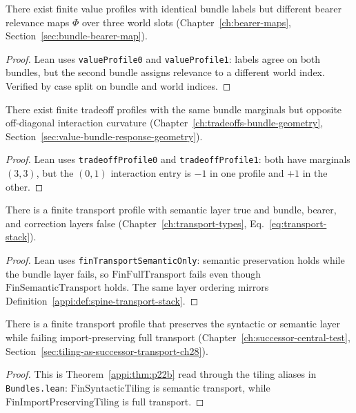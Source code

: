 \begin{theorem}
\label{appi:thm:p17}
There exist finite value profiles with identical bundle labels but different bearer relevance maps \(\Phi\) over three world slots (Chapter~\ref{ch:bearer-maps}, Section~\ref{sec:bundle-bearer-map}).
\end{theorem}
\begin{proof}
Lean uses \texttt{valueProfile0} and \texttt{valueProfile1}: labels agree on both bundles, but the second bundle assigns relevance to a different world index. Verified by case split on bundle and world indices.
\end{proof}

\begin{theorem}
\label{appi:thm:p18}
There exist finite tradeoff profiles with the same bundle marginals but opposite off-diagonal interaction curvature (Chapter~\ref{ch:tradeoffs-bundle-geometry}, Section~\ref{sec:value-bundle-response-geometry}).
\end{theorem}
\begin{proof}
Lean uses \texttt{tradeoffProfile0} and \texttt{tradeoffProfile1}: both have marginals \((3,3)\), but the \((0,1)\) interaction entry is \(-1\) in one profile and \(+1\) in the other.
\end{proof}

\begin{theorem}
\label{appi:thm:p22b}
There is a finite transport profile with semantic layer true and bundle, bearer, and correction layers false (Chapter~\ref{ch:transport-types}, Eq.~\eqref{eq:transport-stack}).
\end{theorem}
\begin{proof}
Lean uses \texttt{finTransportSemanticOnly}: semantic preservation holds while the bundle layer fails, so \(\mathrm{FinFullTransport}\) fails even though \(\mathrm{FinSemanticTransport}\) holds. The same layer ordering mirrors Definition~\ref{appi:def:spine-transport-stack}.
\end{proof}

\begin{theorem}
\label{appi:thm:syntactic-tiling-not-import}
There is a finite transport profile that preserves the syntactic or semantic layer while failing import-preserving full transport (Chapter~\ref{ch:successor-central-test}, Section~\ref{sec:tiling-as-successor-transport-ch28}).
\end{theorem}
\begin{proof}
This is Theorem~\ref{appi:thm:p22b} read through the tiling aliases in \texttt{Bundles.lean}: \(\mathrm{FinSyntacticTiling}\) is semantic transport, while \(\mathrm{FinImportPreservingTiling}\) is full transport.
\end{proof}

